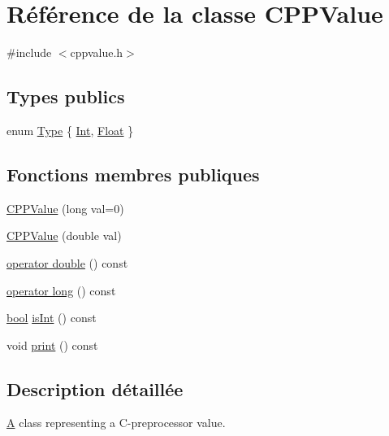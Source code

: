 \hypertarget{class_c_p_p_value}{}\section{Référence de la classe C\+P\+P\+Value}
\label{class_c_p_p_value}


{\ttfamily \#include $<$cppvalue.\+h$>$}

\subsection*{Types publics}
\begin{DoxyCompactItemize}
\item 
enum \hyperlink{class_c_p_p_value_a0a0e186bfc7d4ec0bb75f2c502a6eb34}{Type} \{ \hyperlink{class_c_p_p_value_a0a0e186bfc7d4ec0bb75f2c502a6eb34a501d0429969a9347e432bf79f5733238}{Int}, 
\hyperlink{class_c_p_p_value_a0a0e186bfc7d4ec0bb75f2c502a6eb34ad77c3ba53ac02b46f2909e56b1c8b1eb}{Float}
 \}
\end{DoxyCompactItemize}
\subsection*{Fonctions membres publiques}
\begin{DoxyCompactItemize}
\item 
\hyperlink{class_c_p_p_value_ae973cc2789cb6245795c2e1887b658ab}{C\+P\+P\+Value} (long val=0)
\item 
\hyperlink{class_c_p_p_value_aa0f3cec447b7915d5d664f15bc90a281}{C\+P\+P\+Value} (double val)
\item 
\hyperlink{class_c_p_p_value_a74062cea436bd463ddea47976e64d029}{operator double} () const 
\item 
\hyperlink{class_c_p_p_value_a262c7c81b2f363af5ca2ef0a2756d33a}{operator long} () const 
\item 
\hyperlink{qglobal_8h_a1062901a7428fdd9c7f180f5e01ea056}{bool} \hyperlink{class_c_p_p_value_ab05714192d6ad0fcb09ef6c946db9ec1}{is\+Int} () const 
\item 
void \hyperlink{class_c_p_p_value_af1d42722b8ce3fa2441aab9911e10bb0}{print} () const 
\end{DoxyCompactItemize}


\subsection{Description détaillée}
\hyperlink{class_a}{A} class representing a C-\/preprocessor value. 

